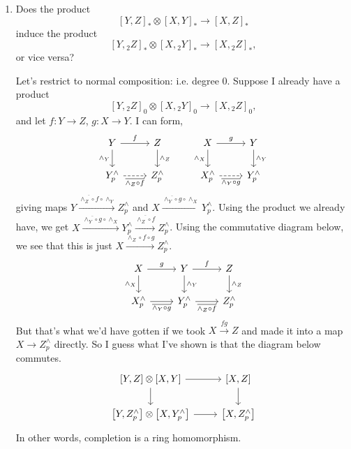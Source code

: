 \documentclass{MetricNotes2023}
\begin{document}
\begin{itemize}
\begin{enumerate}
\item Does the product
\[[Y, Z]_*\otimes [X, Y]_*\to [X, Z]_*\]
induce the product
\[[Y, \text{}_2Z]_*\otimes [X, \text{}_2Y]_*\to [X, \text{}_2Z]_*,\]
or vice versa?

Let's restrict to normal composition: i.e. degree 0. Suppose I already have a product 
\[[Y, \text{}_2Z]_0\otimes [X, \text{}_2Y]_0\to [X, \text{}_2Z]_0,\]
and let \(f : Y \to Z\), \(g : X \to Y\). I can form,
\[\begin{tikzcd}
Y \arrow[r, "f"] \arrow[d, swap, "\wedge_Y"]  & Z \arrow[d, "\wedge_Z"]  \\
Y^\wedge_p \arrow[r, swap, "\overline{\wedge_Z \circ f}", dashrightarrow]  & Z^\wedge_p
\end{tikzcd}\qquad \begin{tikzcd}
X \arrow[r, "g"] \arrow[d, swap, "\wedge_X"]  & Y \arrow[d, "\wedge_Y"]  \\
X^\wedge_p \arrow[r, swap, "\overline{\wedge_Y \circ g}", dashrightarrow]  & Y^\wedge_p
\end{tikzcd}\]
giving maps \(Y \xrightarrow{\overline{\wedge_Z \circ f}\circ \wedge_Y} Z^\wedge_p\) and \(X \xrightarrow{\overline{\wedge_Y \circ g}\circ \wedge_X} Y^\wedge_p\). Using the product we already have, we get \(X \xrightarrow{\overline{\wedge_Y \circ g}\circ \wedge_X} Y^\wedge_p \xrightarrow{\overline{\wedge_Z \circ f}} Z^\wedge_p\). Using the commutative diagram below, we see that this is just \(X \xrightarrow{\wedge_Z\circ f\circ g}Z^\wedge_p\). 
\[\begin{tikzcd}
 X \arrow[r, "g"] \arrow[d, swap, "\wedge_X"]  & Y \arrow[r, "f"] \arrow[d, "\wedge_Y"] & Z \arrow[d, "\wedge_Z"] \\ 
 X^\wedge_p \arrow[r, swap, "\overline{\wedge_Y \circ g}"]  & Y^\wedge_p \arrow[r, "\overline{\wedge_Z \circ f}"'] & Z^\wedge_p 
 \end{tikzcd}\] 
But that's what we'd have gotten if we took \(X \xrightarrow{fg}Z\) and made it into a map \(X \to Z^\wedge_p\) directly. So I guess what I've shown is that the diagram below commutes.
\[\begin{tikzcd}
\left[Y, Z\right]\otimes \left[X, Y\right] \arrow[r, ""] \arrow[d, swap, ""]  & \left[X,Z\right] \arrow[d, ""]  \\
\left[Y, Z^\wedge_p\right] \otimes \left[X, Y^\wedge_p\right] \arrow[r, swap, ""]  & \left[X, Z^\wedge_p\right]
\end{tikzcd}\]
In other words, completion is a ring homomorphism. 
\end{enumerate}
\end{itemize}
\end{document}

